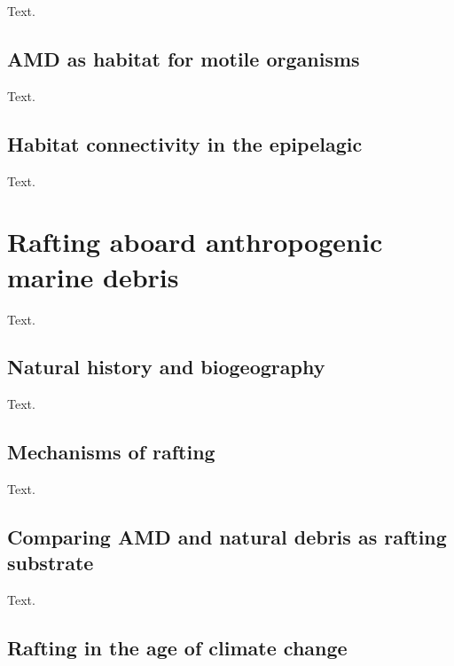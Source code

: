 \documentclass[a4paper, nobind]{templates/ociamthesis}
\begin{document}
Text.

\hypertarget{amd-as-habitat-for-motile-organisms}{%
\subsection{AMD as habitat for motile organisms}\label{amd-as-habitat-for-motile-organisms}}

Text.

\hypertarget{habitat-connectivity-in-the-epipelagic}{%
\subsection{Habitat connectivity in the epipelagic}\label{habitat-connectivity-in-the-epipelagic}}

Text.

\hypertarget{rafting-aboard-anthropogenic-marine-debris}{%
\section{Rafting aboard anthropogenic marine debris}\label{rafting-aboard-anthropogenic-marine-debris}}

Text.

\hypertarget{natural-history-and-biogeography}{%
\subsection{Natural history and biogeography}\label{natural-history-and-biogeography}}

Text.

\hypertarget{mechanisms-of-rafting}{%
\subsection{Mechanisms of rafting}\label{mechanisms-of-rafting}}

Text.

\hypertarget{comparing-amd-and-natural-debris-as-rafting-substrate}{%
\subsection{Comparing AMD and natural debris as rafting substrate}\label{comparing-amd-and-natural-debris-as-rafting-substrate}}

Text.

\hypertarget{rafting-in-the-age-of-climate-change}{%
\subsection{Rafting in the age of climate change}\label{rafting-in-the-age-of-climate-change}}
\end{document}

